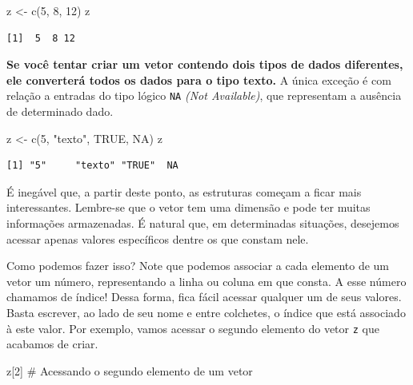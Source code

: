 \documentclass[
  letterpaper,
  DIV=11,
  numbers=noendperiod]{scrreprt}
\newenvironment{Shaded}{\begin{snugshade}}{\end{snugshade}}
\newcommand{\CommentTok}[1]{\textcolor[rgb]{0.37,0.37,0.37}{#1}}
\newcommand{\ConstantTok}[1]{\textcolor[rgb]{0.56,0.35,0.01}{#1}}
\newcommand{\DecValTok}[1]{\textcolor[rgb]{0.68,0.00,0.00}{#1}}
\newcommand{\FunctionTok}[1]{\textcolor[rgb]{0.28,0.35,0.67}{#1}}
\newcommand{\NormalTok}[1]{\textcolor[rgb]{0.00,0.23,0.31}{#1}}
\newcommand{\OtherTok}[1]{\textcolor[rgb]{0.00,0.23,0.31}{#1}}
\newcommand{\StringTok}[1]{\textcolor[rgb]{0.13,0.47,0.30}{#1}}
\begin{document}
\begin{Shaded}
\begin{Highlighting}[]
\NormalTok{z }\OtherTok{\textless{}{-}} \FunctionTok{c}\NormalTok{(}\DecValTok{5}\NormalTok{, }\DecValTok{8}\NormalTok{, }\DecValTok{12}\NormalTok{) }
\NormalTok{z}
\end{Highlighting}
\end{Shaded}

\begin{verbatim}
[1]  5  8 12
\end{verbatim}

\textbf{Se você tentar criar um vetor contendo dois tipos de dados
diferentes, ele converterá todos os dados para o tipo texto.} A única
exceção é com relação a entradas do tipo lógico \texttt{NA} \emph{(Not
Available)}, que representam a ausência de determinado dado.

\begin{Shaded}
\begin{Highlighting}[]
\NormalTok{z }\OtherTok{\textless{}{-}} \FunctionTok{c}\NormalTok{(}\DecValTok{5}\NormalTok{, }\StringTok{"texto"}\NormalTok{, }\ConstantTok{TRUE}\NormalTok{, }\ConstantTok{NA}\NormalTok{)}
\NormalTok{z}
\end{Highlighting}
\end{Shaded}

\begin{verbatim}
[1] "5"     "texto" "TRUE"  NA     
\end{verbatim}

É inegável que, a partir deste ponto, as estruturas começam a ficar mais
interessantes. Lembre-se que o vetor tem uma dimensão e pode ter muitas
informações armazenadas. É natural que, em determinadas situações,
desejemos acessar apenas valores específicos dentre os que constam nele.

Como podemos fazer isso? Note que podemos associar a cada elemento de um
vetor um número, representando a linha ou coluna em que consta. A esse
número chamamos de índice! Dessa forma, fica fácil acessar qualquer um
de seus valores. Basta escrever, ao lado de seu nome e entre colchetes,
o índice que está associado à este valor. Por exemplo, vamos acessar o
segundo elemento do vetor \texttt{z} que acabamos de criar.

\begin{Shaded}
\begin{Highlighting}[]
\NormalTok{z[}\DecValTok{2}\NormalTok{] }\CommentTok{\# Acessando o segundo elemento de um vetor}
\end{Highlighting}
\end{Shaded}
\end{document}
